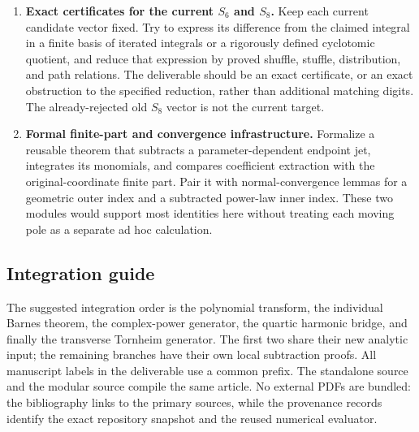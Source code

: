 \begin{enumerate}[label=\textbf{F\arabic*.},leftmargin=*,itemsep=9pt]
 \item \textbf{Exact certificates for the current $S_6$ and $S_8$.}
 Keep each current candidate vector fixed. Try to express its
 difference from the claimed integral in a finite basis of
 iterated integrals or a rigorously defined cyclotomic quotient,
 and reduce that expression by proved shuffle, stuffle,
 distribution, and path relations. The deliverable should be
 an exact certificate, or an exact obstruction to the specified
 reduction, rather than additional matching digits. The
 already-rejected old $S_8$ vector is not the current target.

 \item \textbf{Formal finite-part and convergence infrastructure.}
 Formalize a reusable theorem that subtracts a parameter-dependent
 endpoint jet, integrates its monomials, and compares coefficient
 extraction with the original-coordinate finite part. Pair it
 with normal-convergence lemmas for a geometric outer index and
 a subtracted power-law inner index. These two modules would
 support most identities here without treating each moving pole
 as a separate ad hoc calculation.
\end{enumerate}

\subsection{Integration guide}

The suggested integration order is the polynomial transform,
the individual Barnes theorem, the complex-power generator,
the quartic harmonic bridge, and finally the transverse Tornheim
generator. The first two share their new analytic input;
the remaining branches have their own local subtraction proofs.
All manuscript labels in the deliverable use a common prefix.
The standalone source and the modular source compile the same
article. No external PDFs are bundled: the bibliography links to
the primary sources, while the provenance records identify the
exact repository snapshot and the reused numerical evaluator.
